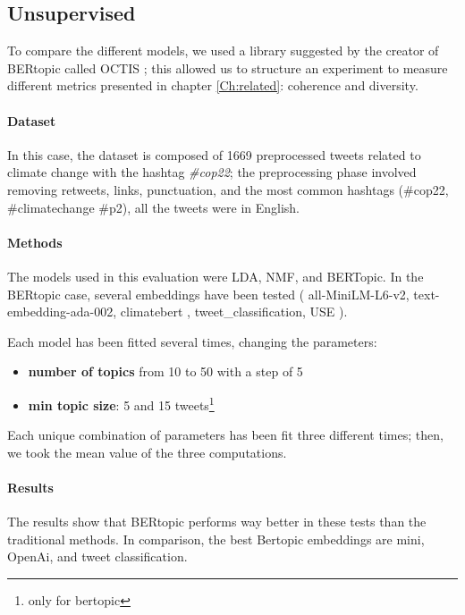 \subsection{Unsupervised}
\label{sec:unsupervised}
To compare the different models, we used a library suggested by the creator of BERtopic called OCTIS \cite{DBLP:conf/clic-it/TerragniF21} \cite{terragni2020octis}; this allowed us to structure an experiment to measure different metrics presented in chapter \ref{Ch:related}: coherence and diversity.




\paragraph{Dataset}
In this case, the dataset is composed of 1669 preprocessed tweets related to climate change with the hashtag \textit{\#cop22}; the preprocessing phase involved removing retweets, links, punctuation, and the most common hashtags (\#cop22, \#climatechange \#p2), all the tweets were in English.

\paragraph{Methods}

The models used in this evaluation were LDA, NMF, and BERTopic. In the BERtopic case, several embeddings have been tested (  all-MiniLM-L6-v2, text-embedding-ada-002, climatebert \cite{webersinke_climatebert_2022}, tweet\_classification, USE \cite{cer_use_2018}).

Each model has been fitted several times, changing the parameters:
\begin{itemize}
    \item  \textbf{number of topics} from 10 to 50 with a step of 5 
    \item \textbf{min topic size}: 5 and 15  tweets\footnote{only for bertopic}
\end{itemize}


Each unique combination of parameters has been fit three different times; then, we took the mean value of the three computations.

\paragraph{Results}
The results show that BERtopic performs way better in these tests than the traditional methods. In comparison, the best Bertopic embeddings are mini, OpenAi, and tweet classification.

